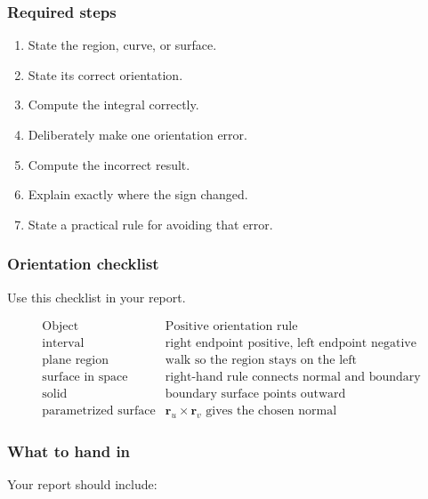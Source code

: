 \subsubsection*{Required steps}

\begin{enumerate}
\item State the region, curve, or surface.

\item State its correct orientation.

\item Compute the integral correctly.

\item Deliberately make one orientation error.

\item Compute the incorrect result.

\item Explain exactly where the sign changed.

\item State a practical rule for avoiding that error.
\end{enumerate}

\subsubsection*{Orientation checklist}

Use this checklist in your report.

\[
\begin{array}{c|l}
\text{Object} & \text{Positive orientation rule} \\ \hline
\text{interval} & \text{right endpoint positive, left endpoint negative}\\[1mm]
\text{plane region} & \text{walk so the region stays on the left}\\[1mm]
\text{surface in space} & \text{right-hand rule connects normal and boundary}\\[1mm]
\text{solid} & \text{boundary surface points outward}\\[1mm]
\text{parametrized surface} & \mathbf r_u\times\mathbf r_v \text{ gives the chosen normal}
\end{array}
\]

\subsubsection*{What to hand in}

Your report should include:

